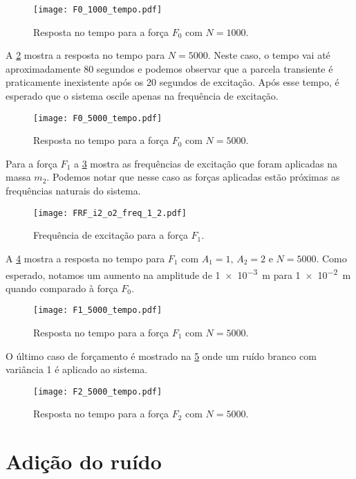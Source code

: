 \begin{figure}
	\centering
	\texttt{[image: F0\_1000\_tempo.pdf]}
	\caption{Resposta no tempo para a força $F_0$ com $N=1000$.}
	\label{fig:F0_1000_tempo}
\end{figure}

A \cref{fig:F0_5000_tempo} mostra a resposta no tempo para $N=5000$. Neste caso, o tempo vai até aproximadamente 80 segundos e podemos observar que a parcela transiente é praticamente inexistente após os 20 segundos de excitação. Após esse tempo, é esperado que o sistema oscile apenas na frequência de excitação.

\begin{figure}
	\centering
	\texttt{[image: F0\_5000\_tempo.pdf]}
	\caption{Resposta no tempo para a força $F_0$ com $N=5000$.}
	\label{fig:F0_5000_tempo}
\end{figure}

Para a força $F_1$ a \cref{fig:FRF_i2_o2_freq_1_2} mostra as frequências de excitação que foram aplicadas na massa $m_2$. Podemos notar que nesse caso as forças aplicadas estão próximas as frequências naturais do sistema.

\begin{figure}
	\centering
	\texttt{[image: FRF\_i2\_o2\_freq\_1\_2.pdf]}
	\caption{Frequência de excitação para a força $F_1$.}
	\label{fig:FRF_i2_o2_freq_1_2}
\end{figure}

A \cref{fig:F1_5000_tempo} mostra a resposta no tempo para $F_1$ com $ A_1 = 1 $, $ A_2 = 2  $ e $ N=5000 $. Como esperado, notamos um aumento na amplitude de \SI{1e-3}{\m} para \SI{1e-2}{\m} quando comparado à força $ F_0 $.

\begin{figure}
	\centering
	\texttt{[image: F1\_5000\_tempo.pdf]}
	\caption{Resposta no tempo para a força $F_1$ com $N=5000$.}
	\label{fig:F1_5000_tempo}
\end{figure}

O último caso de forçamento é mostrado na \cref{fig:F2_5000_tempo} onde um ruído branco com variância 1 é aplicado ao sistema.

\begin{figure}
	\centering
	\texttt{[image: F2\_5000\_tempo.pdf]}
	\caption{Resposta no tempo para a força $F_2$ com $N=5000$.}
	\label{fig:F2_5000_tempo}
\end{figure}

\section{Adição do ruído}

